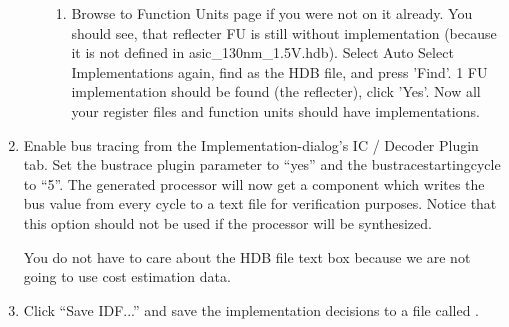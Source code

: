 \documentclass[twoside]{tceusermanual}
\begin{document}
\begin{enumerate}
\begin{enumerate}
\begin{enumerate}
\item%
Browse to Function Units page if you were not on it already. You should see, 
that reflecter FU is still without implementation (because it is not defined 
in asic\_130nm\_1.5V.hdb). Select Auto Select Implementations again, find 
 as the HDB file, and press 'Find'. 1 FU implementation should
be found (the reflecter), click 'Yes'. Now all your register files and 
function units should have implementations.
\end{enumerate}

\end{enumerate}


\item%
Enable bus tracing from the Implementation-dialog's IC / Decoder Plugin tab.
Set the bustrace plugin parameter to ``yes'' and the bustracestartingcycle to
``5''. The generated processor will now get a component which writes the bus
value from every cycle to a text file for verification purposes. Notice that
this option should not be used if the processor will be synthesized.

You do not have to care about the HDB file text box because we are not going
to use cost estimation data.

\item%
  Click ``Save IDF...'' and save the implementation decisions to a file called
  .
\end{enumerate}



%
%
%
\end{document}
